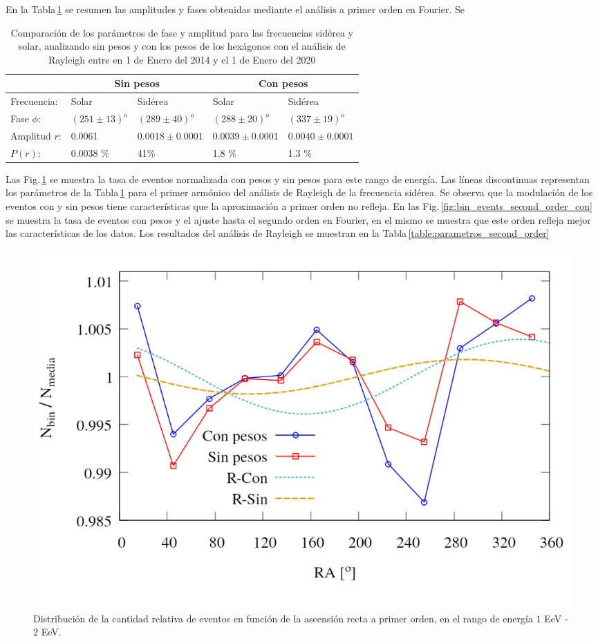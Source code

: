 		
En la Tabla\,\ref{table:parametros_rayleigh} se resumen las amplitudes y fases obtenidas mediante el análisis a primer orden en Fourier. Se
		\begin{table}[H]
		\centering
		\begin{tabular}{|l|l|l|l|l|}
			\cline{2-5}
			\multicolumn{1}{c|}{} & \multicolumn{2}{c|}{Sin pesos} 		& \multicolumn{2}{c|}{Con pesos} \\ \hline
			Frecuencia:           & Solar          & Sidérea       		& Solar         & Sidérea        \\ \hline
			Fase $\phi$:          & $(251\pm13)^o$ & $(289\pm40)^o$		& $(288\pm20)^o$& $(337\pm19)^o$            \\ \hline
			Amplitud $r$:         & 0.0061         & $0.0018\pm0.0001$  & $0.0039\pm0.0001$      & $0.0040\pm0.0001$         \\ \hline
			$P(r)$:               & 0.0038 \%      & 41\%          		& 1.8 \%        & 1.3 \%       \\ \hline    
		\end{tabular}
		\caption{Comparación de los parámetros de fase y amplitud para las frecuencias sidérea y solar, analizando sin pesos y con los pesos de los hexágonos con el análisis de Rayleigh entre en 1 de Enero del 2014 y el 1 de Enero del 2020}
		\label{table:parametros_rayleigh}
		\end{table}


Las Fig.\,\ref{fig:bin_events_first_order} se muestra la tasa de eventos normalizada con pesos y sin pesos para este rango de energía. Las líneas discontinuas representan los parámetros de la Tabla\,\ref{table:parametros_rayleigh} para el primer armónico del análisis de Rayleigh de la frecuencia sidérea. Se observa que la modulación de los eventos con y sin pesos tiene características que la aproximación a primer orden no refleja. 	En las Fig.\,\ref{fig:bin_events_second_order_con} se muestra la tasa de eventos con pesos y el ajuste hasta el segundo orden en Fourier, en el mismo se muestra que este orden refleja mejor las características de los datos. Los resultados del análisis de Rayleigh  se muestran en la Tabla\,\ref{table:parametros_second_order}
	\begin{figure}[H]
		\centering
		\includegraphics[width=0.65\linewidth]{eventos_clasificados_por_RA_v4.png}
		\caption{Distribución de la cantidad relativa de eventos en función de la ascensión recta a primer orden, en el rango de energía $1$ EeV - $2$ EeV.}
		\label{fig:bin_events_first_order}
	\end{figure}


